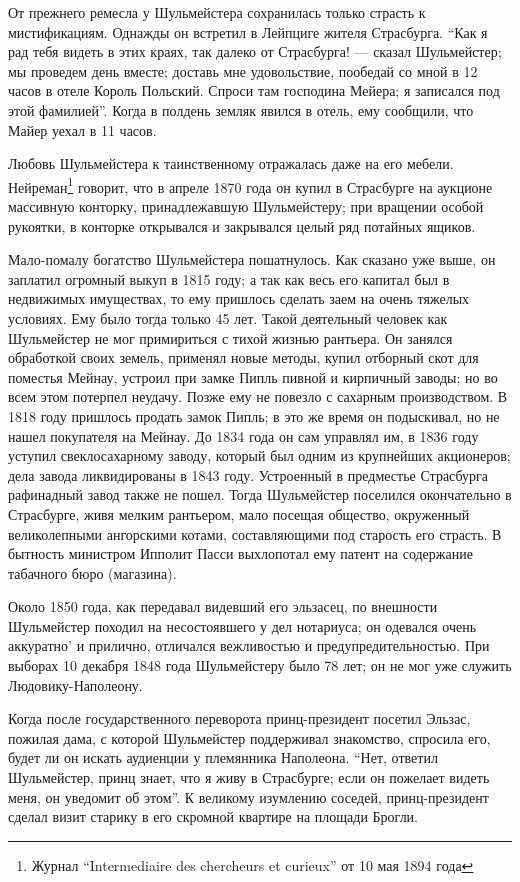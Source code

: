 \documentclass[
  oneside,
  12pt,
  titlepage]{book}
\begin{document}
От прежнего ремесла у Шульмейстера сохранилась только страсть к мистификациям. Однажды он встретил в Лейпциге жителя Страсбурга. ``Как я рад тебя видеть в этих краях, так далеко от Страсбурга! --- сказал Шульмейстер; мы проведем день вместе; доставь мне удовольствие, пообедай со мной в 12 часов в отеле Король Польский. Спроси там господина Мейера; я записался под этой фамилией''. Когда в полдень земляк явился в отель, ему сообщили, что Майер уехал в 11 часов.

Любовь Шульмейстера к таинственному отражалась даже на его мебели. Нейреман\footnote{Журнал ``Intermediaire des chercheurs et curieux'' от 10 мая 1894 года} говорит, что в апреле 1870 года он купил в Страсбурге на аукционе массивную конторку, принадлежавшую Шульмейстеру; при вращении особой рукоятки, в конторке открывался и закрывался целый ряд потайных ящиков.

Мало-помалу богатство Шульмейстера пошатнулось. Как сказано уже выше, он заплатил огромный выкуп в 1815 году; а так как весь его капитал был в недвижимых имуществах, то ему пришлось сделать заем на очень тяжелых условиях. Ему было тогда только 45 лет. Такой деятельный человек как Шульмейстер не мог примириться с тихой жизнью рантьера. Он занялся обработкой своих земель, применял новые методы, купил отборный скот для поместья Мейнау, устроил при замке Пипль пивной и кирпичный заводы; но во всем этом потерпел неудачу. Позже ему не повезло с сахарным производством. В 1818 году пришлось продать замок Пипль; в это же время он подыскивал, но не нашел покупателя на Мейнау. До 1834 года он сам управлял им, в 1836 году уступил свеклосахарному заводу, который был одним из крупнейших акционеров; дела завода ликвидированы в 1843 году. Устроенный в предместье Страсбурга рафинадный завод также не пошел. Тогда Шульмейстер поселился окончательно в Страсбурге, живя мелким рантьером, мало посещая общество, окруженный великолепными ангорскими котами, составляющими под старость его страсть. В бытность министром Ипполит Пасси выхлопотал ему патент на содержание табачного бюро (магазина).

Около 1850 года, как передавал видевший его эльзасец, по внешности Шульмейстер походил на несостоявшего у дел нотариуса; он одевался очень аккуратно' и прилично, отличался вежливостью и предупредительностью. При выборах 10 декабря 1848 года Шульмейстеру было 78 лет; он не мог уже служить Людовику-Наполеону.

Когда после государственного переворота принц-президент посетил Эльзас, пожилая дама, с которой Шульмейстер поддерживал знакомство, спросила его, будет ли он искать аудиенции у племянника Наполеона. ``Нет, ответил Шульмейстер, принц знает, что я живу в Страсбурге; если он пожелает видеть меня, он уведомит об этом''. К великому изумлению соседей, принц-президент сделал визит старику в его скромной квартире на площади Брогли.
\end{document}
